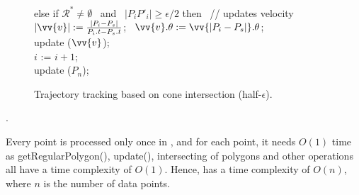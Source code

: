 {\begin{figure}[tb!]
\begin{center}
{\begin{minipage}{3.3in}
{					\icc \>\hspace{3ex} else if $\mathcal{R}^* \ne \emptyset$ ~and~ $|P_iP'_i| \ge \epsilon/2 $ then   ~// updates velocity \\
					\icc \>\hspace{7ex}    $|\vv{v}|:=\frac{|P_i-P_s|}{P_i.t-P_s.t}$; ~$\vv{v}.\theta:=\vv{|P_i-P_s|}.\theta$; \\
					\icc \>\hspace{7ex}    update ($\vv{v}$); \\
					\icc \>\hspace{3ex} $i$ := $i +1$;	\\
					\icc \>\hspace{0ex} update ($P_{n}$); 
				}
				\vspace{-2ex}
				\myhrule
			\end{minipage}
		}
	\end{center}
	\vspace{-1ex}
	\caption{\small Trajectory tracking based on cone intersection (half-$\epsilon$).}
	\label{alg:citt-s-half}
	\vspace{-1ex}
\end{figure}
}

\begin{example}
	\todo.
\end{example}


Every point is processed only once in \citt, and for each point, it needs $O(1)$ time as getRegularPolygon(), update(), intersecting of polygons and other operations all have a time complexity of $O(1)$. Hence, \citt has a time complexity of $O(n)$, where $n$ is the number of data points.






